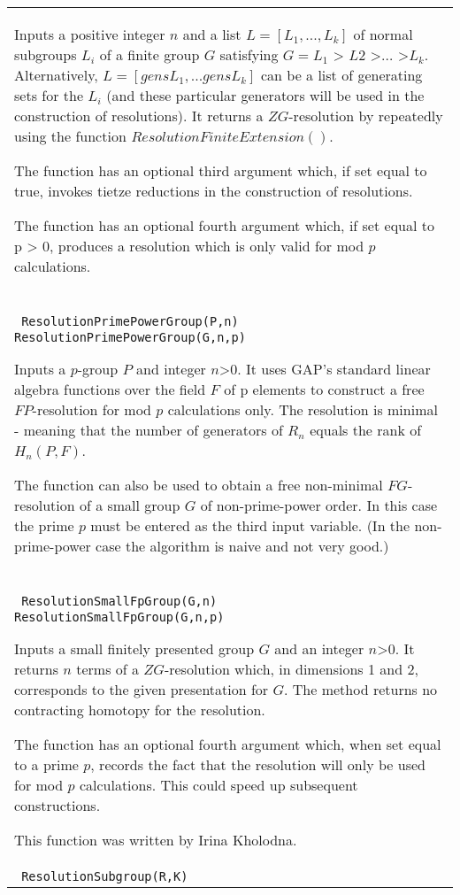 \documentclass[a4paper,11pt]{report}
\begin{document}
{\begin{center}
\begin{tabular}{|l|}
 Inputs a positive integer $n$ and a list $L = [L_1 , ..., L_k]$ of normal subgroups $L_i$ of a finite group $G$ satisfying $G = L_1$ {\textgreater} $L2$ {\textgreater}$ \ldots $ {\textgreater}$ L_k$. Alternatively, $L = [gensL_1, ... gensL_k]$ can be a list of generating sets for the $L_i$ (and these particular generators will be used in the construction of
resolutions). It returns a $ZG$-resolution by repeatedly using the function $ResolutionFiniteExtension()$.

 The function has an optional third argument which, if set equal to true,
invokes tietze reductions in the construction of resolutions.

 The function has an optional fourth argument which, if set equal to p
{\textgreater} 0, produces a resolution which is only valid for mod $p$ calculations. \\
 \index{ResolutionPrimePowerGroup} \texttt{ ResolutionPrimePowerGroup(P,n) } {\nobreakspace} \texttt{ ResolutionPrimePowerGroup(G,n,p)} 

 Inputs a $p$-group $P$ and integer $n${\textgreater}$0$. It uses GAP's standard linear algebra functions over the field $F$ of p elements to construct a free $FP$-resolution for mod $p$ calculations only. The resolution is minimal - meaning that the number of
generators of $R_n$ equals the rank of $H_n(P,F)$. 

 The function can also be used to obtain a free non-minimal $FG$-resolution of a small group $G$ of non-prime-power order. In this case the prime $p$ must be entered as the third input variable. (In the non-prime-power case the
algorithm is naive and not very good.) \\
 \index{ResolutionSmallFpGroup} \texttt{ ResolutionSmallFpGroup(G,n) } {\nobreakspace} \texttt{ ResolutionSmallFpGroup(G,n,p) } 

 Inputs a small finitely presented group $G$ and an integer $n${\textgreater}$0$. It returns $n$ terms of a $ZG$-resolution which, in dimensions 1 and 2, corresponds to the given
presentation for $G$. The method returns no contracting homotopy for the resolution.

 The function has an optional fourth argument which, when set equal to a prime $p$, records the fact that the resolution will only be used for mod $p$ calculations. This could speed up subsequent constructions. 

 This function was written by Irina Kholodna. \\
 \index{ResolutionSubgroup} \texttt{ ResolutionSubgroup(R,K)} 


\end{tabular}
\end{center}}
\end{document}
